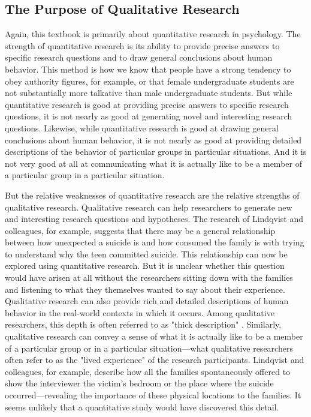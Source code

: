 \subsection{The Purpose of Qualitative Research}

Again, this textbook is primarily about quantitative research in psychology. The strength of quantitative research is its ability to provide precise answers to specific research questions and to draw general conclusions about human behavior. This method is how we know that people have a strong tendency to obey authority figures, for example, or that female undergraduate students are not substantially more talkative than male undergraduate students. But while quantitative research is good at providing precise answers to specific research questions, it is not nearly as good at generating novel and interesting research questions. Likewise, while quantitative research is good at drawing general conclusions about human behavior, it is not nearly as good at providing detailed descriptions of the behavior of particular groups in particular situations. And it is not very good at all at communicating what it is actually like to be a member of a particular group in a particular situation.

But the relative weaknesses of quantitative research are the relative strengths of qualitative research. Qualitative research can help researchers to generate new and interesting research questions and hypotheses. The research of Lindqvist and colleagues, for example, suggests that there may be a general relationship between how unexpected a suicide is and how consumed the family is with trying to understand why the teen committed suicide. This relationship can now be explored using quantitative research. But it is unclear whether this question would have arisen at all without the researchers sitting down with the families and listening to what they themselves wanted to say about their experience. Qualitative research can also provide rich and detailed descriptions of human behavior in the real-world contexts in which it occurs. Among qualitative researchers, this depth is often referred to as "thick description" \cite{geertz_interpretation_1973}. Similarly, qualitative research can convey a sense of what it is actually like to be a member of a particular group or in a particular situation---what qualitative researchers often refer to as the "lived experience" of the research participants. Lindqvist and colleagues, for example, describe how all the families spontaneously offered to show the interviewer the victim's bedroom or the place where the suicide occurred---revealing the importance of these physical locations to the families. It seems unlikely that a quantitative study would have discovered this detail.

